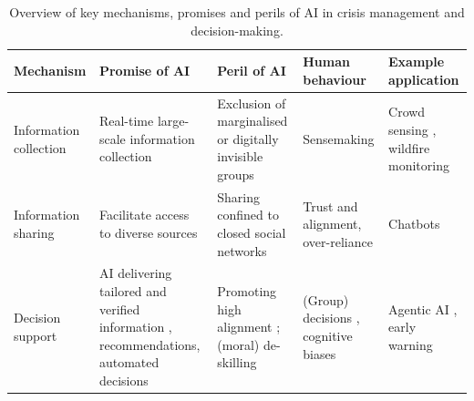 \begin{table}[h]
\caption{Overview of key mechanisms, promises and perils of AI in crisis management and decision-making.}\label{tab:S10}
\small
\begin{tabular}{@{}p{2.0cm}p{2.4cm}p{2.4cm}p{2.4cm}p{2.4cm}@{}}
\toprule
Mechanism & Promise of AI & Peril of AI & Human behaviour & Example application \\
\midrule
Information collection & Real-time large-scale information collection \citep{narmatha2025disaster} & Exclusion of marginalised or digitally invisible groups \citep{coleman2024weaving} & Sensemaking \citep{klein2010rapid} & Crowd sensing \citep{mai2025evaluating}, wildfire monitoring \citep{roy2024multi} \\
Information sharing & Facilitate access to diverse sources \citep{jeon2024hearhere} & Sharing confined to closed social networks & Trust and alignment, over-reliance \citep{manzini2024should} & Chatbots \citep{urbanelli2024ermes} \\
Decision support & AI delivering tailored and verified information \citep{zhao2025tailoring}, recommendations, automated decisions & Promoting high alignment \citep{manzini2024should}; (moral) de-skilling \citep{vallor2015moral} & (Group) decisions \citep{comes2024ai}, cognitive biases \citep{paulus2022influence} & Agentic AI \citep{acharya2025agentic}, early warning \citep{reichstein2025early} \\
\bottomrule
\end{tabular}
\end{table}
